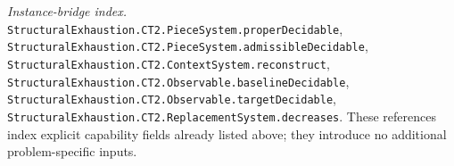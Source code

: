 \emph{Instance-bridge index.} \texttt{Structural\allowbreak{}Exhaustion.\allowbreak{}CT2.\allowbreak{}Piece\allowbreak{}System.\allowbreak{}proper\allowbreak{}Decidable}, \texttt{Structural\allowbreak{}Exhaustion.\allowbreak{}CT2.\allowbreak{}Piece\allowbreak{}System.\allowbreak{}admissible\allowbreak{}Decidable}, \texttt{Structural\allowbreak{}Exhaustion.\allowbreak{}CT2.\allowbreak{}Context\allowbreak{}System.\allowbreak{}reconstruct}, \texttt{Structural\allowbreak{}Exhaustion.\allowbreak{}CT2.\allowbreak{}Observable.\allowbreak{}baseline\allowbreak{}Decidable}, \texttt{Structural\allowbreak{}Exhaustion.\allowbreak{}CT2.\allowbreak{}Observable.\allowbreak{}target\allowbreak{}Decidable}, \texttt{Structural\allowbreak{}Exhaustion.\allowbreak{}CT2.\allowbreak{}Replacement\allowbreak{}System.\allowbreak{}decreases}. These references index explicit capability fields already listed above; they introduce no additional problem-specific inputs.

